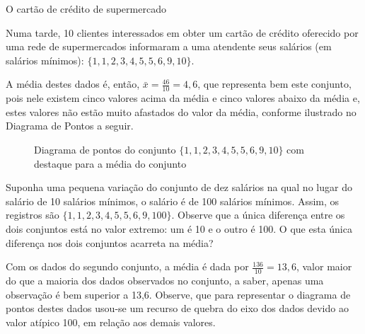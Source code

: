 \begin{example}{O cartão de crédito de supermercado}

Numa tarde, 10 clientes interessados em obter um cartão de crédito oferecido por uma rede de supermercados informaram a uma atendente seus salários (em salários mínimos): \(\{1, 1, 2, 3, 4, 5, 5, 6, 9, 10\}\).

A média destes dados é, então, \(\bar{x}=\frac{46}{10}=4,6\), que representa bem este conjunto, pois nele existem cinco valores acima da média e cinco valores abaixo da média e, estes valores não estão muito afastados do valor da média, conforme ilustrado no Diagrama de Pontos a seguir.

\begin{figure}[H]
\centering
\capstart

\caption{Diagrama de pontos do conjunto \(\{1, 1, 2, 3, 4, 5, 5, 6, 9, 10\}\) com destaque para a média do conjunto}\label{\detokenize{PE104-1:fig-diagramadepontos-media-sem-outlier}}\label{\detokenize{PE104-1:id12}}\end{figure}

Suponha uma pequena variação do conjunto de dez salários na qual no lugar do salário de 10 salários mínimos, o salário é de 100 salários mínimos. Assim, os registros são \(\{1, 1, 2, 3, 4, 5, 5, 6, 9, 100\}\).  Observe que a única diferença entre os dois conjuntos está no valor extremo: um é 10 e o outro é 100. O que esta única diferença nos dois conjuntos acarreta na média?

Com os dados do segundo conjunto, a média é dada por \(\frac{136}{10}=13,6\), valor maior do que a maioria dos dados observados no conjunto, a saber, apenas uma observação é bem superior a 13,6. Observe, que para representar o diagrama de pontos destes dados usou-se um recurso de quebra do eixo dos dados devido ao valor atípico 100, em relação aos demais valores.


\end{example}
